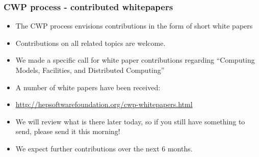 \begin{frame}
\frametitle{CWP process - contributed whitepapers}

\begin{itemize}
\item The CWP process envisions contributions in the form of short white papers
\item Contributions on all related topics are welcome.
\item We made a specific call for white paper contributions regarding ``Computing Models, Facilities, and Distributed Computing'' 
\item A number of white papers have been received:
\item \url{http://hepsoftwarefoundation.org/cwp-whitepapers.html}
\item We will review what is there later today, so if you still have something to send, please send it this morning!
\item We expect further contributions over the next 6 months.

\end{itemize}

\end{frame}



